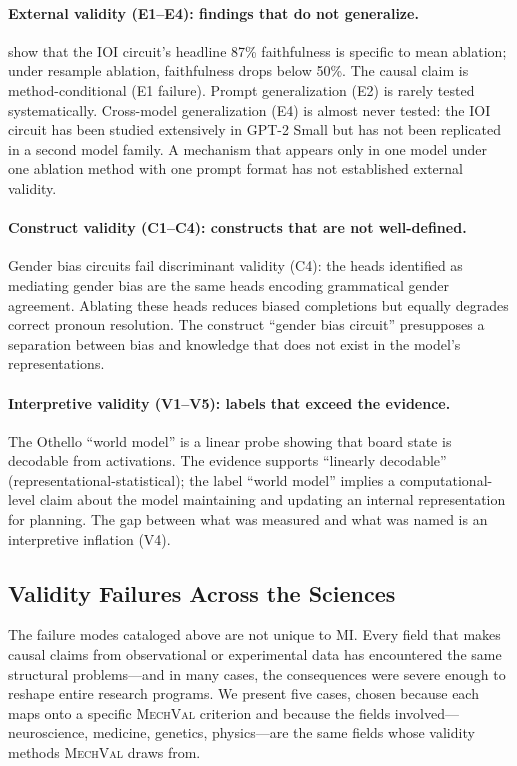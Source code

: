 \documentclass{article}
\newcommand{\mechval}{\textsc{MechVal}}
\begin{document}
\paragraph{External validity (E1--E4): findings that do not generalize.}
\citet{miller2024transformer} show that the IOI circuit's headline 87\% faithfulness is specific to mean ablation; under resample ablation, faithfulness drops below 50\%. The causal claim is method-conditional (E1 failure). Prompt generalization (E2) is rarely tested systematically. Cross-model generalization (E4) is almost never tested: the IOI circuit has been studied extensively in GPT-2 Small but has not been replicated in a second model family. A mechanism that appears only in one model under one ablation method with one prompt format has not established external validity.

\paragraph{Construct validity (C1--C4): constructs that are not well-defined.}
Gender bias circuits \citep{vig2020gender} fail discriminant validity (C4): the heads identified as mediating gender bias are the same heads encoding grammatical gender agreement. Ablating these heads reduces biased completions but equally degrades correct pronoun resolution. The construct ``gender bias circuit'' presupposes a separation between bias and knowledge that does not exist in the model's representations.

\paragraph{Interpretive validity (V1--V5): labels that exceed the evidence.}
The Othello ``world model'' \citep{li2023othello} is a linear probe showing that board state is decodable from activations. The evidence supports ``linearly decodable'' (representational-statistical); the label ``world model'' implies a computational-level claim about the model maintaining and updating an internal representation for planning. The gap between what was measured and what was named is an interpretive inflation (V4).

\subsection{Validity Failures Across the Sciences}

The failure modes cataloged above are not unique to MI. Every field that makes causal claims from observational or experimental data has encountered the same structural problems---and in many cases, the consequences were severe enough to reshape entire research programs. We present five cases, chosen because each maps onto a specific \mechval{} criterion and because the fields involved---neuroscience, medicine, genetics, physics---are the same fields whose validity methods \mechval{} draws from.
\end{document}
